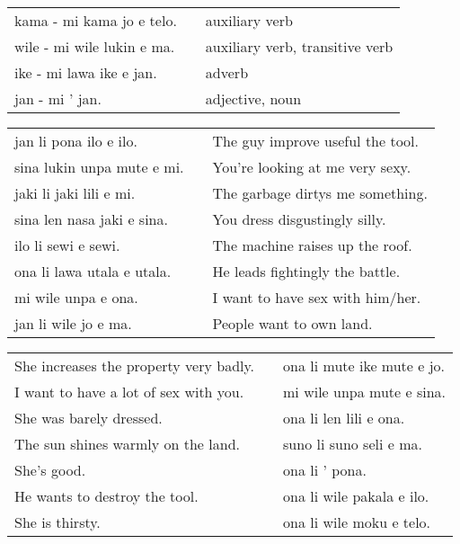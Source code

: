 \begin{supertabular}{p{5,5cm}|ll}
kama - mi kama jo e telo. && auxiliary verb \\ %
wile - mi wile lukin e ma. && auxiliary verb, transitive verb \\ %
ike - mi lawa ike e jan. && adverb \\ %
jan - mi ' jan.  && adjective, noun \\ %
\end{supertabular} 

\begin{supertabular}{p{5,5cm}|ll}
jan li pona ilo e ilo. && The guy improve useful the tool. \\ 
sina lukin unpa mute e mi. && You're looking at me very sexy.   \\ 
jaki li jaki lili e mi. && The garbage dirtys me something. \\ 
sina len nasa jaki e sina. && You dress disgustingly silly. \\ 
ilo li sewi e sewi. && The machine raises up the roof. \\ 
ona li lawa utala e utala. && He leads fightingly the battle. \\ 
mi wile unpa e ona. && I want to have sex with him/her.  \\
jan li wile jo e ma. && People want to own land. \\
\end{supertabular}  

\begin{supertabular}{p{5,5cm}|ll}
She increases the property very badly. && ona li mute ike mute e jo. \\ %
I want to have a lot of sex with you. && mi wile unpa mute e sina. \\ %
She was barely dressed. && ona li len lili e ona. \\ %
The sun shines warmly on the land. && suno li suno seli e ma. \\ %
She's good. && ona li ' pona. \\ %
He wants to destroy the tool. && ona li wile pakala e ilo. \\ %
She is thirsty. && ona li wile moku e telo. \\ %
\end{supertabular} 

